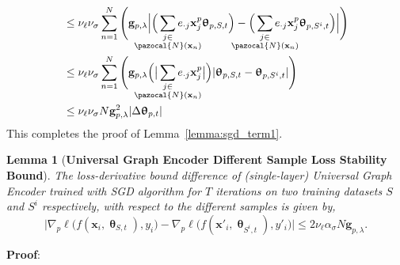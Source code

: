 \documentclass{article}
\newtheorem{lemma}{Lemma}
\newcommand{\Na}{\pazocal{N}}
\begin{document}
\begin{equation*} 	
\begin{split}
& \leq \nu_{\ell}  \nu_{\sigma}   \sum_{n=1}^{N}  \Bigg( \mathbf{g}_{p,\lambda}   \Big|  \Big( \sum_{\mathclap{\substack{j\in \\ \Na(\mathbf{x}_n)}}}  e_{\cdot j}  \mathbf{x}^{p}_{j}  \bm{\uptheta}_{p, S, t} \Big)   -  \Big( \sum_{\mathclap{\substack{j\in \\ \Na(\mathbf{x}_n)}}}  e_{\cdot j}  \mathbf{x}^{p}_{j}  \bm{\uptheta}_{p, S^{i}, t} \Big)    \Big|   \Bigg) \\
& \leq \nu_{\ell}  \nu_{\sigma} \sum_{n=1}^{N}  \Bigg(  \mathbf{g}_{p, \lambda} \Big( \big| \sum_{\mathclap{\substack{j\in \\ \Na(\mathbf{x}_n)}}}  e_{\cdot j}  \mathbf{x}^{p}_{j}  \big| \Big)   |\bm{\uptheta}_{p, S, t} - \bm{\uptheta}_{p, S^{i}, t}| \Bigg) \\
& \leq \nu_{\ell}  \nu_{\sigma} N \mathbf{g}_{p, \lambda}^2 | \Delta\bm{\uptheta}_{p, t}|  
\end{split}
\end{equation*}
This completes the proof of Lemma~\ref{lemma:sgd_term1}. \\

\begin{lemma}[\textbf{Universal Graph Encoder    Different Sample Loss Stability Bound}]\label{lemma:sgd_term2}
	\textit{The   loss-derivative bound difference   of (single-layer) Universal Graph Encoder     trained with SGD algorithm for $T$ iterations on two training datasets $S$ and $S^i$ respectively,  with respect to  the  different samples     is given by,}
	$$ \Big|   \nabla_{p} \ell\big(f(\mathbf{x}_i,\bm{\uptheta}_{S, t} ),y_i \big)   -      \nabla_{p} \ell\big(f(\mathbf{x}'_i,\bm{\uptheta}_{S^{i}, t} ),y'_i \big)   \Big| \leq 2\nu_{\ell} \alpha_{\sigma} N\mathbf{g}_{p, \lambda}. $$
\end{lemma}
\noindent \textbf{Proof}: 
\end{document}
